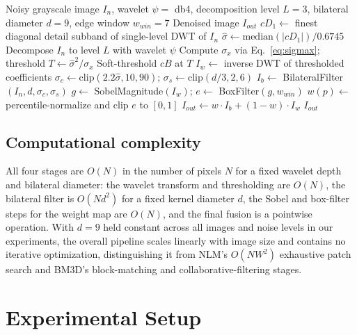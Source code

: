 \documentclass[final,3p,times,twocolumn,nopreprintline]{elsarticle}
\begin{document}
\begin{algorithm}[t]
\caption{Adaptive Wavelet--Guided Bilateral (AWGB) Filter}
\label{alg:awgb}
\begin{algorithmic}[1]
\Require Noisy grayscale image $I_n$, wavelet $\psi=$ db4, decomposition level $L=3$, bilateral diameter $d=9$, edge window $w_{win}=7$
\Ensure Denoised image $I_{out}$
\State $cD_1 \gets$ finest diagonal detail subband of single-level DWT of $I_n$
\State $\hat\sigma \gets \mathrm{median}(|cD_1|)/0.6745$ 
\State Decompose $I_n$ to level $L$ with wavelet $\psi$
    \State Compute $\sigma_x$ via Eq.~\eqref{eq:sigmax}; threshold $T \gets \hat\sigma^2/\sigma_x$
    \State Soft-threshold $cB$ at $T$ 
\EndFor
\State $I_w \gets$ inverse DWT of thresholded coefficients
\State $\sigma_c \gets \mathrm{clip}(2.2\hat\sigma, 10, 90)$; $\sigma_s \gets \mathrm{clip}(d/3, 2, 6)$
\State $I_b \gets$ BilateralFilter$(I_n, d, \sigma_c, \sigma_s)$ 
\State $g \gets$ SobelMagnitude$(I_w)$; $e \gets$ BoxFilter$(g, w_{win})$ 
\State $w(p) \gets$ percentile-normalize and clip $e$ to $[0,1]$ 
\State $I_{out} \gets w \cdot I_b + (1-w)\cdot I_w$ 
\State \Return $I_{out}$
\end{algorithmic}
\end{algorithm}

\subsection{Computational complexity}
All four stages are $O(N)$ in the number of pixels $N$ for a fixed wavelet depth and bilateral diameter: the wavelet transform and thresholding are $O(N)$, the bilateral filter is $O(N d^2)$ for a fixed kernel diameter $d$, the Sobel and box-filter steps for the weight map are $O(N)$, and the final fusion is a pointwise operation. With $d=9$ held constant across all images and noise levels in our experiments, the overall pipeline scales linearly with image size and contains no iterative optimization, distinguishing it from NLM's $O(N W^2)$ exhaustive patch search and BM3D's block-matching and collaborative-filtering stages.

\section{Experimental Setup}
\label{sec:experiments}
\end{document}
